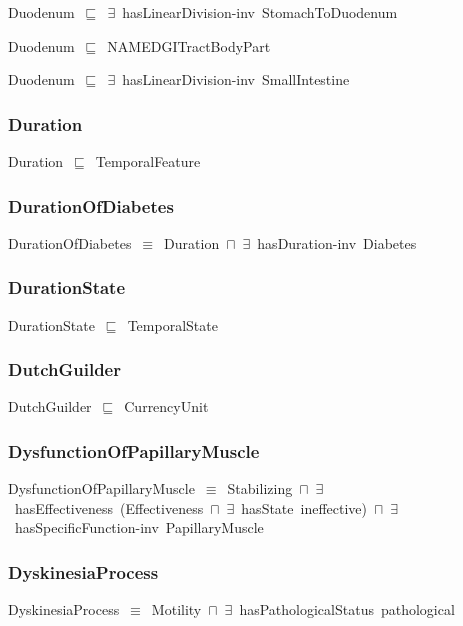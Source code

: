 \documentclass{article}
\begin{document}
Duodenum~\ensuremath{\sqsubseteq}~\ensuremath{\exists}~hasLinearDivision-inv~StomachToDuodenum~

Duodenum~\ensuremath{\sqsubseteq}~NAMEDGITractBodyPart~

Duodenum~\ensuremath{\sqsubseteq}~\ensuremath{\exists}~hasLinearDivision-inv~SmallIntestine~

\subsubsection*{Duration}

Duration~\ensuremath{\sqsubseteq}~TemporalFeature~

\subsubsection*{DurationOfDiabetes}

DurationOfDiabetes~\ensuremath{\equiv}~Duration~\ensuremath{\sqcap}~\ensuremath{\exists}~hasDuration-inv~Diabetes

\subsubsection*{DurationState}

DurationState~\ensuremath{\sqsubseteq}~TemporalState~

\subsubsection*{DutchGuilder}

DutchGuilder~\ensuremath{\sqsubseteq}~CurrencyUnit~

\subsubsection*{DysfunctionOfPapillaryMuscle}

DysfunctionOfPapillaryMuscle~\ensuremath{\equiv}~Stabilizing~\ensuremath{\sqcap}~\ensuremath{\exists}~hasEffectiveness~(Effectiveness~\ensuremath{\sqcap}~\ensuremath{\exists}~hasState~ineffective)~\ensuremath{\sqcap}~\ensuremath{\exists}~hasSpecificFunction-inv~PapillaryMuscle

\subsubsection*{DyskinesiaProcess}

DyskinesiaProcess~\ensuremath{\equiv}~Motility~\ensuremath{\sqcap}~\ensuremath{\exists}~hasPathologicalStatus~pathological
\end{document}
